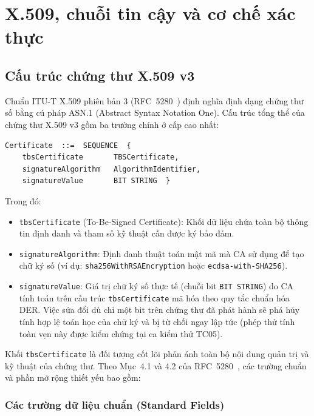 \chapter{X.509, chuỗi tin cậy và cơ chế xác thực}
\label{chap:x509-xac-thuc}
\section{Cấu trúc chứng thư X.509 v3}
\label{sec:x509-structure}

Chuẩn ITU-T X.509 phiên bản 3 (RFC~5280~\cite{rfc5280}) định nghĩa định dạng chứng thư số bằng cú pháp ASN.1 (Abstract Syntax Notation One). Cấu trúc tổng thể của chứng thư X.509 v3 gồm ba trường chính ở cấp cao nhất:
\begin{verbatim}
Certificate  ::=  SEQUENCE  {
    tbsCertificate       TBSCertificate,
    signatureAlgorithm   AlgorithmIdentifier,
    signatureValue       BIT STRING  }
\end{verbatim}

Trong đó:
\begin{itemize}
    \item \texttt{tbsCertificate} (To-Be-Signed Certificate): Khối dữ liệu chứa toàn bộ thông tin định danh và tham số kỹ thuật cần được ký bảo đảm.
    \item \texttt{signatureAlgorithm}: Định danh thuật toán mật mã mà CA sử dụng để tạo chữ ký số (ví dụ: \texttt{sha256WithRSAEncryption} hoặc \texttt{ecdsa-with-SHA256}).
    \item \texttt{signatureValue}: Giá trị chữ ký số thực tế (chuỗi bit \texttt{BIT STRING}) do CA tính toán trên cấu trúc \texttt{tbsCertificate} mã hóa theo quy tắc chuẩn hóa DER. Việc sửa đổi dù chỉ một bit trên chứng thư đã phát hành sẽ phá hủy tính hợp lệ toán học của chữ ký và bị từ chối ngay lập tức (phép thử tính toàn vẹn này được kiểm chứng tại ca kiểm thử TC05).
\end{itemize}

Khối \texttt{tbsCertificate} là đối tượng cốt lõi phản ánh toàn bộ nội dung quản trị và kỹ thuật của chứng thư. Theo Mục~4.1 và 4.2 của RFC~5280~\cite{rfc5280}, các trường chuẩn và phần mở rộng thiết yếu bao gồm:

\subsection{Các trường dữ liệu chuẩn (Standard Fields)}
\label{subsec:standard-fields}

